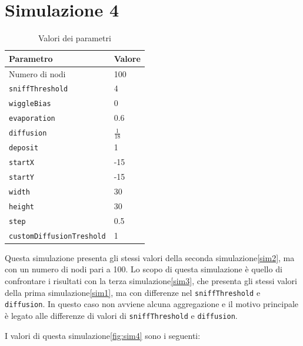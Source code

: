 \section{Simulazione 4}\label{sim4}
\begin{table}[ht]
    \centering
    \caption{Valori dei parametri}
    \begin{tabular}{ll}
        \hline
        Parametro                   & Valore \\
        \hline
        Numero di nodi              & 100    \\
        \texttt{sniffThreshold}     & 4      \\
        \texttt{wiggleBias}         & 0      \\
        \texttt{evaporation}        & 0.6    \\
        \texttt{diffusion}          & $\frac{1}{18}$ \\
        \texttt{deposit}            & 1      \\
        \texttt{startX}             & -15    \\
        \texttt{startY}             & -15    \\
        \texttt{width}              & 30     \\
        \texttt{height}             & 30     \\
        \texttt{step}               & 0.5    \\
        \texttt{customDiffusionTreshold} & 1 \\
        \hline
    \end{tabular}\label{tab:parametri4}
\end{table}

Questa simulazione presenta gli stessi valori della seconda simulazione\space\cref{sim2}, ma con un numero di nodi pari a 100.
Lo scopo di questa simulazione è quello di confrontare i risultati con la terza simulazione\space\cref{sim3}, che presenta gli stessi valori della prima simulazione\space\cref{sim1},
ma con differenze nel \texttt{sniffThreshold} e \texttt{diffusion}. In questo caso non avviene alcuna aggregazione e 
il motivo principale è legato alle differenze di valori di \texttt{sniffThreshold} e \texttt{diffusion}.

I valori di questa simulazione\space \cref{fig:sim4} sono i seguenti:


